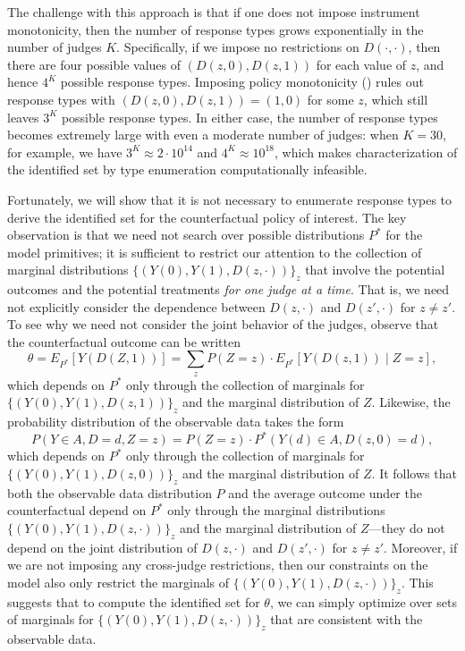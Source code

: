 \documentclass[12pt]{article}%
\theoremstyle{definition}
\newcommand\1{\operatorname{I}\indicatorfence}
\begin{document}
The challenge with this approach is that if one does not impose instrument
monotonicity, then the number of response types grows exponentially in the number
of judges $K$. Specifically, if we impose no restrictions on $D(\cdot, \cdot)$,
then there are four possible values of $(D(z,0), D(z,1))$ for each value of $z$,
and hence $4^K$ possible response types. Imposing policy monotonicity
() rules out response types with
$(D(z,0), D(z,1)) = (1, 0)$ for some $z$, which still leaves $3^K$ possible response types. In
either case, the number of response types becomes extremely large with even a moderate
number of judges: when $K=30$, for example, we have
$3^K \approx 2 \cdot 10^{14}$ and $4^K \approx 10^{18}$, which makes
characterization of the identified set by type enumeration computationally
infeasible.

Fortunately, we will show that it is not necessary to enumerate response types
to derive the identified set for the counterfactual policy of interest. The key
observation is that we need not search over possible distributions $P^*$ for the
model primitives; it is sufficient to restrict our attention to the collection
of marginal distributions $\{(Y(0), Y(1), D(z, \cdot))\}_{z}$ that involve the
potential outcomes and the potential treatments \emph{for one judge at a time}. That is, we need not explicitly consider the dependence between $D(z,\cdot)$ and $D(z',\cdot)$ for $z \neq z'$.
To see why we need not consider the joint behavior of the judges, observe that
the counterfactual outcome can be written
\begin{equation*}
  \theta = E_{P^{*}}[Y(D(Z,1))] = \sum_z P(Z=z) \cdot E_{P^{*}}[Y(D(z,1)) \mid Z=z],
\end{equation*}
which depends on $P^*$ only through the collection of marginals for
$\{(Y(0), Y(1), D(z,1)) \}_z$ and the marginal distribution of $Z$. Likewise, the
probability distribution of the observable data takes the form
\begin{equation*}
  P(Y \in A, D=d, Z=z) = P(Z=z) \cdot P^{*}(Y(d) \in A, D(z,0) =d),
\end{equation*}
which depends on $P^*$ only through the collection of marginals for
$\{(Y(0), Y(1), D(z,0))\}_{z}$ and the marginal distribution of $Z$. It follows
that both the observable data distribution $P$ and the average outcome under the
counterfactual depend on $P^*$ only through the marginal distributions
$\{(Y(0), Y(1), D(z, \cdot))\}_{z}$ and the marginal distribution of $Z$---they do
not depend on the joint distribution of $D(z, \cdot)$ and $D(z', \cdot)$ for
$z \neq z'$. Moreover, if we are not imposing any cross-judge restrictions, then our constraints on the model also only restrict the marginals of $\{(Y(0), Y(1), D(z, \cdot))\}_{z}$. This suggests that to compute the identified set for $\theta$, we
can simply optimize over sets of marginals for $\{(Y(0), Y(1), D(z, \cdot)) \}_z$
that are consistent with the observable data.
\end{document}
